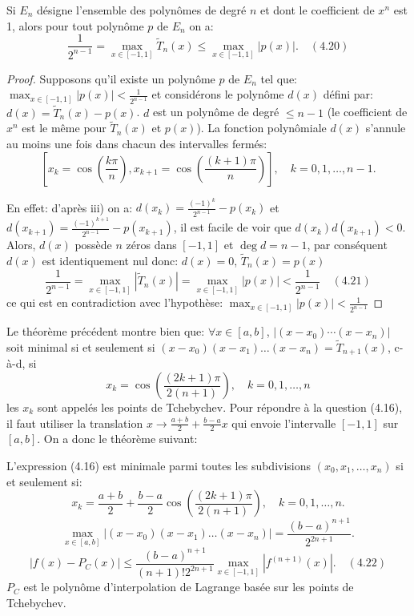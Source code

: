\begin{theoreme}
	Si $E_n$ désigne l'ensemble des polynômes de degré $n$ et dont le coefficient de $x^n$ est 1, alors pour tout polynôme $p$ de $E_n$ on a:
	\[
	\frac{1}{2^{n-1}} = \max_{x \in [-1,1]} \tilde{T}_n(x) \leq \max_{x \in [-1,1]} |p(x)|. \quad (4.20)
	\]
\end{theoreme}

\begin{proof}
	Supposons qu'il existe un polynôme $p$ de $E_n$ tel que: $\max_{x \in [-1,1]} |p(x)| < \frac{1}{2^{n-1}}$ et considérons le polynôme $d(x)$ défini par: $d(x) = \tilde{T}_n(x) - p(x)$. $d$ est un polynôme de degré $\leq n-1$ (le coefficient de $x^n$ est le même pour $\tilde{T}_n(x)$ et $p(x)$). La fonction polynômiale $d(x)$ s'annule au moins une fois dans chacun des intervalles fermés:
	\[
	[x_k = \cos(\frac{k\pi}{n}), x_{k+1} = \cos(\frac{(k+1)\pi}{n})], \quad k = 0,1,\ldots,n-1.
	\]
	
	En effet: d'après iii) on a: $d(x_k) = \frac{(-1)^k}{2^{n-1}} - p(x_k)$ et $d(x_{k+1}) = \frac{(-1)^{k+1}}{2^{n-1}} - p(x_{k+1})$, il est facile de voir que $d(x_k)d(x_{k+1}) < 0$. Alors, $d(x)$ possède $n$ zéros dans $[-1,1]$ et $\deg d = n-1$, par conséquent $d(x)$ est identiquement nul donc: $d(x) = 0$, $\tilde{T}_n(x) = p(x)$
	\[
	\frac{1}{2^{n-1}} = \max_{x \in [-1,1]} |\tilde{T}_n(x)| = \max_{x \in [-1,1]} |p(x)| < \frac{1}{2^{n-1}} \quad (4.21)
	\]
	ce qui est en contradiction avec l'hypothèse: $\max_{x \in [-1,1]} |p(x)| < \frac{1}{2^{n-1}}$
\end{proof}

Le théorème précédent montre bien que: $\forall x \in [a, b]$, $|(x-x_0)\cdots(x-x_n)|$ soit minimal si et seulement si $(x-x_0)(x-x_1)\ldots(x-x_n) = \tilde{T}_{n+1}(x)$, c-à-d, si
\[
x_k = \cos(\frac{(2k+1)\pi}{2(n+1)}), \quad k = 0,1,\ldots,n
\]
les $x_k$ sont appelés les points de Tchebychev. Pour répondre à la question (4.16), il faut utiliser la translation $x \rightarrow \frac{a+b}{2} + \frac{b-a}{2}x$ qui envoie l'intervalle $[-1,1]$ sur $[a, b]$. On a donc le théorème suivant:

\begin{theoreme}
	L'expression (4.16) est minimale parmi toutes les subdivisions $(x_0,x_1,\ldots,x_n)$ si et seulement si:
	\[
	x_k = \frac{a+b}{2} + \frac{b-a}{2}\cos(\frac{(2k+1)\pi}{2(n+1)}), \quad k = 0,1,\ldots,n.
	\]
	\[
	\max_{x \in [a,b]} |(x-x_0)(x-x_1)\ldots(x-x_n)| = \frac{(b-a)^{n+1}}{2^{2n+1}}.
	\]
	\[
	|f(x)-P_C(x)| \leq \frac{(b-a)^{n+1}}{(n+1)!2^{2n+1}} \max_{x \in [-1,1]} |f^{(n+1)}(x)|. \quad (4.22)
	\]
	$P_C$ est le polynôme d'interpolation de Lagrange basée sur les points de Tchebychev.
\end{theoreme}

